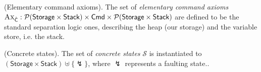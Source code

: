 \begin{defn}
	(Elementary command axioms).
	The set of \emph{elementary command axioms} $\textsc{Ax}_{\hat{\mathsf{C}}} : \mathcal{P}(\mathsf{Storage} \times \mathsf{Stack}) \times \mathsf{Cmd} \times \mathcal{P}(\mathsf{Storage} \times \mathsf{Stack})$ are defined to be the standard separation logic ones, describing the heap (our storage) and the variable store, i.e. the stack.

	\iffalse	
	For every rule's triple $\Delta \vdash \triple{P}{\hat{\mathds{C}}}{Q}$, logical environment $e \in \mathsf{LEnv}$ and predicate environment $\delta \in \mathsf{PEnv}$, we define the corresponding axiom as $\lfloor \tsem{P}_{e, \delta} \rfloor_W \times \hat{\mathds{C}} \times \lfloor \tsem{Q}_{e, \delta} \rfloor_W$.
	\begin{gather*}
		\infer[\textsc{Write}]
		{
			\vdash
			\triple
				{\mathds{E}_1 \mapsto -}
				{\pmutate{\mathds{E}_1}{\mathds{E}_2}}
				{\mathds{E}_1 \mapsto \mathds{E}_2}
		}
		{}
		\\
		\infer[\textsc{Read}]
		{
			\vdash
			\triple
				{\pvar{x} \doteq \mathds{E}_1 \sep \cell{\mathds{E}}{\mathds{E}_2}}
				{\pderef{\pvar{x}}{\mathds{E}}}
				{\pvar{x} \doteq \mathds{E}_2[\mathds{E}_1/\pvar{x}] \sep \cell{\mathds{E}[\mathds{E}_1/\pvar{x}]}{\mathds{E}_2[\mathds{E}_1/\pvar{x}]}}
		}
		{}
		\\
		\infer[\textsc{Assign}]
		{
			\vdash
			\triple
				{P}
				{\passign{\pvar{x}}{\mathds{E}}}
				{\exists x \ldotp \pvar{x} \doteq \mathds{E}[x/\pvar{x}] \sep P[x/\pvar{x}]}	
		}
		{}
		\\
		\infer[\textsc{Alloc}]
		{
			\vdash
			\triple
				{\mathtt{emp}}
				{\palloc{\pvar{x}}{\mathds{E}}}
				{\exists y \ldotp \pvar{x} \doteq y \sep \circledast_{0 \leq i < \mathds{E}} \left(\cell{y + i}{0}\right)}
		}
		{}
	\end{gather*}
	The listed axioms come directly from the ones in standard separation logic.
	\fi
\end{defn}

\begin{defn}
	(Concrete states).
	The set of \emph{concrete states} $\mathcal{S}$ is instantiated to $(\mathsf{Storage} \times \mathsf{Stack}) \uplus \{\lightning\}$, where $\lightning$ represents a faulting state..
\end{defn}

